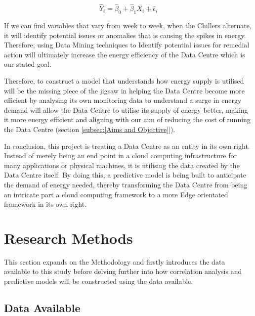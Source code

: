 \documentclass[12pt]{scrartcl}
\begin{document}
\begin{equation}
\hat{Y}_i = \hat{\beta}_0 + \hat{\beta}_1 X_i + \hat{\epsilon}_i
\end{equation}


If we can find variables that vary from week to week, when the Chillers alternate, it will identify potential issues or anomalies that is causing the spikes in energy. Therefore, using Data Mining techniques to Identify potential issues for remedial action will ultimately increase the energy efficiency of the Data Centre which is our stated goal.      

 

Therefore, to construct a model that understands how energy supply is utilised will be the missing piece of the jigsaw in helping the Data Centre become more efficient by analysing its own monitoring data to understand a surge in energy demand will allow the Data Centre to utilise its supply of energy better, making it more energy efficient and aligning with our aim of reducing the cost of running the Data Centre (section \ref{subsec:[Aims and Objective]}).

 

In conclusion, this project is treating a Data Centre as an entity in its own right. Instead of merely being an end point in a cloud computing infrastructure for many applications or physical machines, it is utilising the data created by the Data Centre itself. By doing this, a predictive model is being built to anticipate the demand of energy needed, thereby transforming the Data Centre from being an intricate part a cloud computing framework to a more Edge orientated framework in its own right.    

 

\section{Research Methods}

\label{sec:[Research Methods]}

This section expands on the Methodology and firstly introduces the data available to this study before delving further into how correlation analysis and predictive models will be constructed using the data available.

 

\subsection{Data Available}
\end{document}
